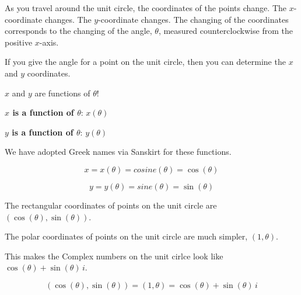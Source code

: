 \documentclass{ximera}
\begin{document}
\qquad


As you travel around the unit circle, the coordinates of the points change. The $x$-coordinate changes.  The $y$-coordinate changes. The changing of the coordinates corresponds to the changing of the angle, $\theta$, measured counterclockwise from the positive $x$-axis.   

If you give the angle for a point on the unit circle, then you can determine the $x$ and $y$ coordinates.

$x$ and $y$ are functions of $\theta$! 


\begin{center}

\textbf{\textcolor{blue!55!black}{$x$ is a function of $\theta$}}: $x(\theta)$ 

\textbf{\textcolor{blue!55!black}{$y$ is a function of $\theta$}}: $y(\theta)$ 

\end{center}




We have adopted Greek names via Sanskirt for these functions.



\[
x = x(\theta) = cosine(\theta) = \cos(\theta)
\]




\[
y = y(\theta) = sine(\theta) = \sin(\theta)
\]



The rectangular coordinates of points on the unit circle are $(\cos(\theta), \sin(\theta))$. 

The polar coordinates of points on the unit circle are much simpler, $(1, \theta)$. 

This makes the Complex numbers on the unit cirlce look like $\cos(\theta) + \sin(\theta) \, i$. 




\[
(\cos(\theta), \sin(\theta)) = (1, \theta) = \cos(\theta) + \sin(\theta) \, i
\]

























\qquad
\end{document}

